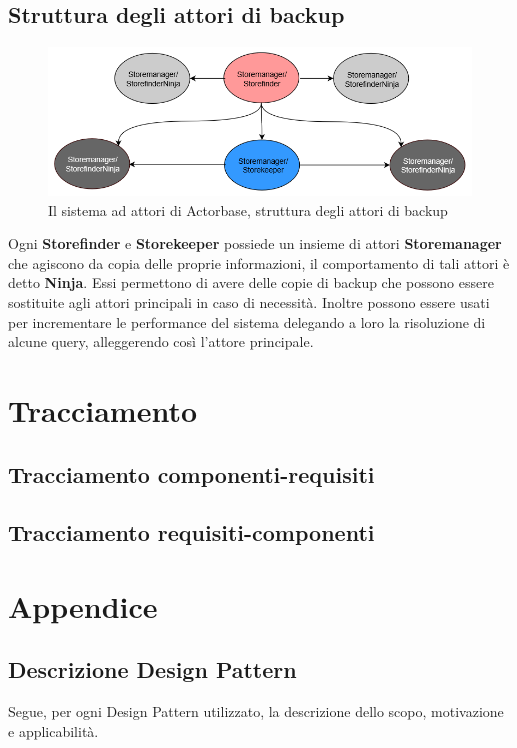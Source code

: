 \documentclass[a4paper]{article}
\begin{document}
	\subsection{Struttura degli attori di backup}
					\begin{figure}[H]
					\centering
					\includegraphics[width=\textwidth]{immagini/ST/backup}
					\caption{Il sistema ad attori di Actorbase, struttura degli attori di backup}
				\end{figure}
Ogni \textbf{Storefinder} e \textbf{Storekeeper} possiede un insieme di attori \textbf{Storemanager} che agiscono da copia delle proprie informazioni, il comportamento di tali attori è detto \textbf{Ninja}. Essi permettono di avere delle copie di backup che possono essere sostituite agli attori principali in caso di necessità. Inoltre possono essere usati per incrementare le performance del sistema delegando a loro la risoluzione di alcune query, alleggerendo così l'attore principale.
	
	\newpage 
	\section{Tracciamento}
		\subsection{Tracciamento componenti-requisiti}
		\subsection{Tracciamento requisiti-componenti}
		
	\newpage 
	\section{Appendice}
	\subsection{Descrizione Design Pattern}
	Segue, per ogni Design Pattern utilizzato, la descrizione dello scopo, motivazione e applicabilità.
\end{document}
